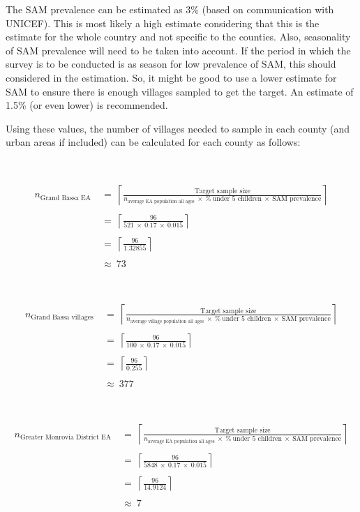 \documentclass[12pt,a4paper]{book}
\theoremstyle{definition}
\theoremstyle{definition}
\theoremstyle{definition}
\theoremstyle{remark}
\begin{document}
The SAM prevalence can be estimated as 3\% (based on communication with
UNICEF). This is most likely a high estimate considering that this is
the estimate for the whole country and not specific to the counties.
Also, seasonality of SAM prevalence will need to be taken into account.
If the period in which the survey is to be conducted is as season for
low prevalence of SAM, this should considered in the estimation. So, it
might be good to use a lower estimate for SAM to ensure there is enough
villages sampled to get the target. An estimate of 1.5\% (or even lower)
is recommended.

Using these values, the number of villages needed to sample in each
county (and urban areas if included) can be calculated for each county
as follows:

~

\[\begin{aligned} 
n_{\text{Grand Bassa EA}} & ~ = ~ \left \lceil \frac{\text{Target sample size}}{n_{\text{average EA population all ages}} ~ \times ~ \% ~ \text{under 5 children} ~ \times ~ \text{SAM prevalence}} \right \rceil \\
\\
& ~ = ~ \left \lceil \frac{96}{521 ~ \times ~ 0.17 ~ \times ~ 0.015} \right \rceil \\
\\
& ~ = ~ \left \lceil \frac{96}{1.32855} \right \rceil \\
\\
& ~ \approx ~ 73
\end{aligned}\]

~

\[\begin{aligned} 
n_{\text{Grand Bassa villages}} & ~ = ~ \left \lceil \frac{\text{Target sample size}}{n_{\text{average village population all ages}} ~ \times ~ \% ~ \text{under 5 children} ~ \times ~ \text{SAM prevalence}} \right \rceil \\
\\
& ~ = ~ \left \lceil \frac{96}{100 ~ \times ~ 0.17 ~ \times ~ 0.015} \right \rceil \\
\\
& ~ = ~ \left \lceil \frac{96}{0.255} \right \rceil \\
\\
& ~ \approx ~ 377
\end{aligned}\]

~

\[\begin{aligned} 
n_{\text{Greater Monrovia District EA}} & ~ = ~ \left \lceil \frac{\text{Target sample size}}{n_{\text{average EA population all ages}} ~ \times ~ \% ~ \text{under 5 children} ~ \times ~ \text{SAM prevalence}} \right \rceil \\
\\
& ~ = ~ \left \lceil \frac{96}{5848 ~ \times ~ 0.17 ~ \times ~ 0.015} \right \rceil \\
\\
& ~ = ~ \left \lceil \frac{96}{14.9124} \right \rceil \\
\\
& ~ \approx ~ 7
\end{aligned}\]
\end{document}
